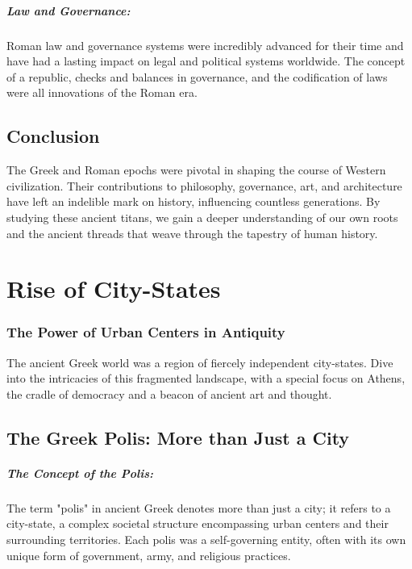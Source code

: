 \documentclass[a4paper,12pt]{book}
\begin{document}
\paragraph{Law and Governance:}
Roman law and governance systems were incredibly advanced for their time and have had a lasting impact on legal and political systems worldwide. The concept of a republic, checks and balances in governance, and the codification of laws were all innovations of the Roman era.

\section*{Conclusion}

The Greek and Roman epochs were pivotal in shaping the course of Western civilization. Their contributions to philosophy, governance, art, and architecture have left an indelible mark on history, influencing countless generations. By studying these ancient titans, we gain a deeper understanding of our own roots and the ancient threads that weave through the tapestry of human history.

\chapter{Rise of City-States}
\subsection*{The Power of Urban Centers in Antiquity}
The ancient Greek world was a region of fiercely independent city-states. Dive into the intricacies of this fragmented landscape, with a special focus on Athens, the cradle of democracy and a beacon of ancient art and thought.

\section*{The Greek Polis: More than Just a City}

\paragraph{The Concept of the Polis:}
The term "polis" in ancient Greek denotes more than just a city; it refers to a city-state, a complex societal structure encompassing urban centers and their surrounding territories. Each polis was a self-governing entity, often with its own unique form of government, army, and religious practices.
\end{document}
